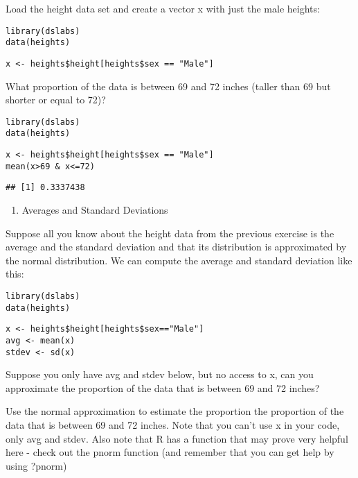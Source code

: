 \documentclass[]{article}
\providecommand{\tightlist}{%
  \setlength{\itemsep}{0pt}\setlength{\parskip}{0pt}}
\begin{document}
Load the height data set and create a vector x with just the male
heights:

\begin{verbatim}
library(dslabs)  
data(heights)  
\end{verbatim}

\begin{verbatim}
x <- heights$height[heights$sex == "Male"]  
\end{verbatim}

What proportion of the data is between 69 and 72 inches (taller than 69
but shorter or equal to 72)?

\begin{verbatim}
library(dslabs)
data(heights)
\end{verbatim}

\begin{verbatim}
x <- heights$height[heights$sex == "Male"]
mean(x>69 & x<=72)
\end{verbatim}

\begin{verbatim}
## [1] 0.3337438
\end{verbatim}

\begin{enumerate}
\def\labelenumi{\arabic{enumi}.}
\setcounter{enumi}{1}
\tightlist
\item
  Averages and Standard Deviations
\end{enumerate}

Suppose all you know about the height data from the previous exercise is
the average and the standard deviation and that its distribution is
approximated by the normal distribution. We can compute the average and
standard deviation like this:

\begin{verbatim}
library(dslabs)  
data(heights)  
\end{verbatim}

\begin{verbatim}
x <- heights$height[heights$sex=="Male"]  
avg <- mean(x)  
stdev <- sd(x)  
\end{verbatim}

Suppose you only have avg and stdev below, but no access to x, can you
approximate the proportion of the data that is between 69 and 72 inches?

Use the normal approximation to estimate the proportion the proportion
of the data that is between 69 and 72 inches. Note that you can't use x
in your code, only avg and stdev. Also note that R has a function that
may prove very helpful here - check out the pnorm function (and remember
that you can get help by using ?pnorm)
\end{document}
